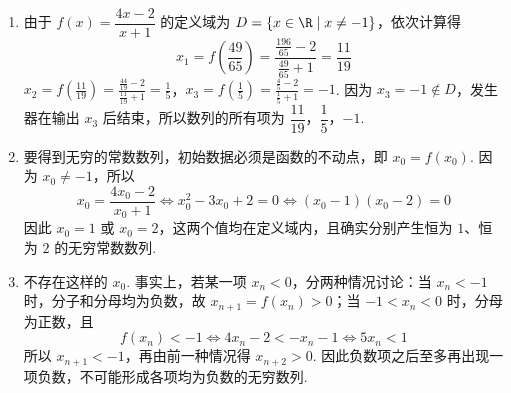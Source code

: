 \begin{solution}
\begin{enumerate}
\item 由于 \(f(x)=\dfrac{4x-2}{x+1}\) 的定义域为 \(D=\{x\in\R\mid x\ne-1\}\)，依次计算得
\[
x_1=f\left(\frac{49}{65}\right)=\frac{\frac{196}{65}-2}{\frac{49}{65}+1}=\frac{11}{19}
\]
\(x_2=f\left(\frac{11}{19}\right)=\frac{\frac{44}{19}-2}{\frac{11}{19}+1}=\frac{1}{5}\)，\(x_3=f\left(\frac{1}{5}\right)=\frac{\frac{4}{5}-2}{\frac{1}{5}+1}=-1\).
因为 \(x_3=-1\notin D\)，发生器在输出 \(x_3\) 后结束，所以数列的所有项为 \(\dfrac{11}{19}\)，\(\dfrac{1}{5}\)，\(-1\).
\item 要得到无穷的常数数列，初始数据必须是函数的不动点，即 \(x_0=f(x_0)\). 因为 \(x_0\ne-1\)，所以
\[
x_0=\frac{4x_0-2}{x_0+1}\Longleftrightarrow x_0^2-3x_0+2=0\Longleftrightarrow (x_0-1)(x_0-2)=0
\]
因此 \(x_0=1\) 或 \(x_0=2\)，这两个值均在定义域内，且确实分别产生恒为 \(1\)、恒为 \(2\) 的无穷常数数列.
\item 不存在这样的 \(x_0\). 事实上，若某一项 \(x_n<0\)，分两种情况讨论：当 \(x_n<-1\) 时，分子和分母均为负数，故 \(x_{n+1}=f(x_n)>0\)；当 \(-1<x_n<0\) 时，分母为正数，且
\[
f(x_n)<-1\Longleftrightarrow 4x_n-2<-x_n-1\Longleftrightarrow 5x_n<1
\]
所以 \(x_{n+1}<-1\)，再由前一种情况得 \(x_{n+2}>0\). 因此负数项之后至多再出现一项负数，不可能形成各项均为负数的无穷数列.
\end{enumerate}
\end{solution}
